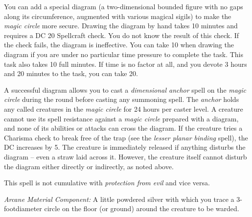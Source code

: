 You can add a special diagram (a two-dimensional bounded figure with no gaps along 
its circumference, augmented with various magical sigils) to make the \textit{magic 
circle} more secure. Drawing the diagram by hand takes 10 minutes and requires 
a DC 20 Spellcraft check. You do not know the result of this check. If the check 
fails, the diagram is ineffective. You can take 10 when drawing the diagram if 
you are under no particular time pressure to complete the task. This task also 
takes 10 full minutes. If time is no factor at all, and you devote 3 hours and 
20 minutes to the task, you can take 20.

A successful diagram allows you to cast a \textit{dimensional anchor} spell on 
the \textit{magic circle} during the round before casting any summoning spell. 
The \textit{anchor} holds any called creatures in the \textit{magic circle} for 
24 hours per caster level. A creature cannot use its spell resistance against a 
\textit{magic circle} prepared with a diagram, and none of its abilities or attacks 
can cross the diagram. If the creature tries a Charisma check to break free of 
the trap (see the \textit{lesser planar binding} spell), the DC increases by 5. 
The creature is immediately released if anything disturbs the diagram -- even a 
straw laid across it. However, the creature itself cannot disturb the diagram either 
directly or indirectly, as noted above.

This spell is not cumulative with \textit{protection from evil} and vice versa.

\textit{Arcane Material Component:} A little powdered silver with which you trace 
a 3-footdiameter circle on the floor (or ground) around the creature to be warded.

